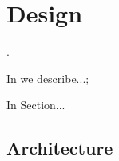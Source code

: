 \chapter{Design}\label{chap:design}
\dummy .

\begin{chapterorganization}
  \item In  we describe...;
  \item In Section...
\end{chapterorganization}

\section{Architecture}\label{sec:architecture}
